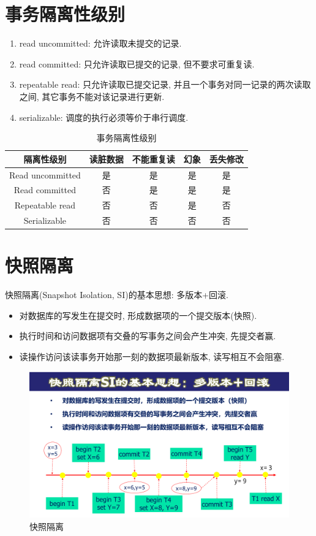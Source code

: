 \section{事务隔离性级别}

\begin{enumerate}
    \item read uncommitted: 允许读取未提交的记录.
    \item read committed: 只允许读取已提交的记录, 但不要求可重复读.
    \item repeatable read: 只允许读取已提交记录, 并且一个事务对同一记录的两次读取之间, 其它事务不能对该记录进行更新.
    \item serializable: 调度的执行必须等价于串行调度.
\end{enumerate}

\begin{table}[H]
  \centering
  \begin{tabular}{|c|c|c|c|c|}
    \hline
    \textbf{隔离性级别} & \textbf{读脏数据} & \textbf{不能重复读} & \textbf{幻象} & \textbf{丢失修改} \\ \hline
    Read uncommitted & 是 & 是 & 是 & 是 \\ \hline
    Read committed & 否 & 是 & 是 & 是 \\ \hline
    Repeatable read & 否 & 否 & 是 & 否 \\ \hline
    Serializable & 否 & 否 & 否 & 否 \\ \hline
  \end{tabular}
  \caption{事务隔离性级别}
\end{table}

\section{快照隔离}

快照隔离(Snapshot Isolation, SI)的基本思想: 多版本+回滚.
\begin{itemize}
  \item 对数据库的写发生在提交时, 形成数据项的一个提交版本(快照).
  \item 执行时间和访问数据项有交叠的写事务之间会产生冲突, 先提交者赢.
  \item 读操作访问该读事务开始那一刻的数据项最新版本, 读写相互不会阻塞.
\end{itemize}

\begin{figure}[H]
    \centering
    \includegraphics[width=.6\textwidth]{./figure/快照隔离.pdf}
    \caption{快照隔离}
\end{figure}

